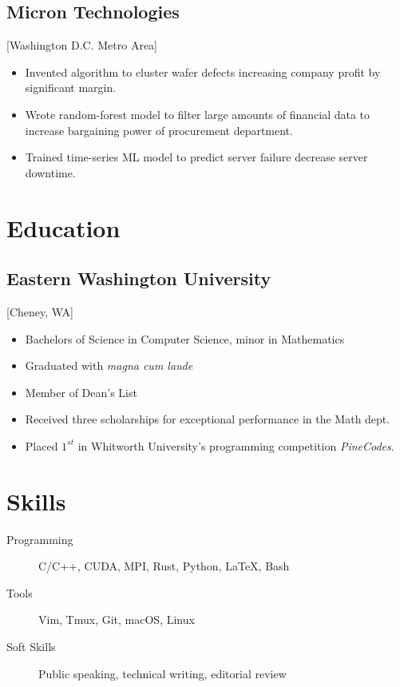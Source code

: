 \documentclass{mycv}
\begin{document}
\subsection{Micron Technologies}[Washington D.C. Metro Area]
\begin{positions}
\end{positions}

\begin{itemize}
  \item Invented algorithm to cluster wafer defects increasing company profit by significant margin.
  \item Wrote random-forest model to filter large amounts of financial data to increase bargaining power of procurement department.
  \item Trained time-series ML model to predict server failure decrease server downtime.
\end{itemize}

\section{Education}

\subsection{Eastern Washington University}[Cheney, WA]
\vspace{-\parskip}%
\begin{itemize}[label={}]
  \item Bachelors of Science in Computer Science, minor in Mathematics 
  \item Graduated with \textit{magna cum laude}
  \item Member of Dean's List
  \item Received three scholarships for exceptional performance in the Math dept.
  \item Placed $1^{st}$ in Whitworth University's programming competition \textit{PineCodes}. 
\end{itemize}

\section{Skills}

\begin{description}
  \item[Programming] C/C++, CUDA, MPI, Rust, Python, \LaTeX, Bash
  \item[Tools] Vim, Tmux, Git, macOS, Linux
  \item[Soft Skills] Public speaking, technical writing, editorial review
\end{description}
\end{document}
